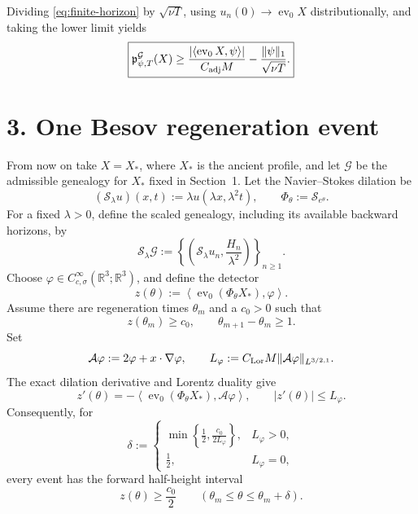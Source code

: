 \documentclass[11pt]{article}
\newcommand{\R}{\mathbb R}
\newcommand{\cG}{\mathcal G}
\newcommand{\cS}{\mathcal S}
\newcommand{\ev}{\operatorname{ev}}
\newcommand{\LorentzDual}{L^{3/2,1}}
\begin{document}
Dividing \eqref{eq:finite-horizon} by \(\sqrt{\nu T}\), using
\(u_n(0)\to\ev_0X\) distributionally, and taking the lower limit yields
\begin{equation}
  \boxed{
  \mathfrak p^\cG_{\psi,T}(X)
  \ge
  \frac{|\langle\ev_0X,\psi\rangle|}
       {C_{\rm adj}M}
  -\frac{\|\psi\|_1}{\sqrt{\nu T}} .}
  \label{eq:cost-lower}
\end{equation}

\section*{3. One Besov regeneration event}

From now on take \(X=X_*\), where \(X_*\) is the ancient profile, and let
\(\cG\) be the admissible genealogy for \(X_*\) fixed in Section~1.  Let
the Navier--Stokes dilation be
\[
  (\cS_\lambda u)(x,t)
  :=\lambda u(\lambda x,\lambda^2t),
  \qquad
  \Phi_\theta:=\cS_{e^\theta}.
\]
For a fixed \(\lambda>0\), define the scaled genealogy, including its
available backward horizons, by
\begin{equation}
  \cS_\lambda\cG
  :=
  \left\{
    \left(\cS_\lambda u_n,\frac{H_n}{\lambda^2}\right)
  \right\}_{n\ge1}.
  \label{eq:scaled-genealogy}
\end{equation}
Choose
\(\varphi\in C^\infty_{c,\sigma}(\R^3;\R^3)\), and define the detector
\begin{equation}
  z(\theta)
  :=
  \left\langle
    \ev_0(\Phi_\theta X_*),\varphi
  \right\rangle .
  \label{eq:observable}
\end{equation}
Assume there are regeneration times \(\theta_m\) and a \(c_0>0\) such
that
\[
  z(\theta_m)\ge c_0,
  \qquad
  \theta_{m+1}-\theta_m\ge1.
\]
Set
\[
  \mathcal A\varphi:=2\varphi+x\cdot\nabla\varphi,
  \qquad
  L_\varphi
  :=C_{\rm Lor}M
    \|\mathcal A\varphi\|_{\LorentzDual}.
\]
The exact dilation derivative and Lorentz duality give
\[
  z'(\theta)
  =-\left\langle
      \ev_0(\Phi_\theta X_*),\mathcal A\varphi
    \right\rangle,
  \qquad
  |z'(\theta)|\le L_\varphi.
\]
Consequently, for
\begin{equation}
  \delta
  :=
  \begin{cases}
    \displaystyle
    \min\left\{\frac12,\frac{c_0}{2L_\varphi}\right\},
      &L_\varphi>0,\\[6pt]
    \displaystyle\frac12,&L_\varphi=0,
  \end{cases}
  \label{eq:delta}
\end{equation}
every event has the forward half-height interval
\begin{equation}
  z(\theta)\ge\frac{c_0}{2}
  \qquad
  (\theta_m\le\theta\le\theta_m+\delta).
  \label{eq:persistence}
\end{equation}
\end{document}
